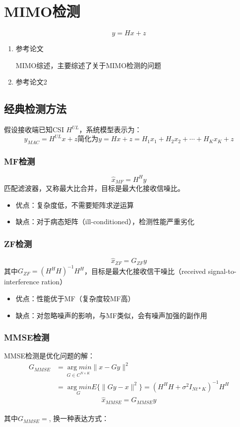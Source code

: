 \section{MIMO检测}
$$
y=Hx+z
$$

\begin{enumerate}
    \item  参考论文\cite{2019Massive} \par
        MIMO综述，主要综述了关于MIMO检测的问题
    \item 参考论文2
\end{enumerate}
\subsection{经典检测方法}
假设接收端已知CSI $H^{UL}$，系统模型表示为：
\begin{equation}
y_{MAC}=H^{UL}x+z 简化为 y=Hx+z=H_1x_1+H_2x_2+\cdots+H_Kx_K+z
\end{equation}
\subsubsection{MF检测}
\begin{equation}
\hat{x}_{MF}=H^Hy
\end{equation}
匹配滤波器，又称最大比合并，目标是最大化接收信噪比。
\begin{itemize}
    \item 优点：复杂度低，不需要矩阵求逆运算
    \item 缺点：对于病态矩阵（ill-conditioned），检测性能严重劣化
\end{itemize}
    
\subsubsection{ZF检测}
\begin{equation}
    \hat{x}_{ZF}=G_{ZF}y
\end{equation}
其中$G_{ZF}=(H^HH)^{-1}H^H$，目标是最大化接收信干噪比（received signal-to-interference ration）
\begin{itemize}
    \item 优点：性能优于MF（复杂度较MF高）
    \item 缺点：对忽略噪声的影响，与MF类似，会有噪声加强的副作用
\end{itemize}
\subsubsection{MMSE检测}
MMSE检测是优化问题的解：
\begin{equation}
\begin{aligned}
    G_{MMSE}&=\underset{G\in C^{N \times K}}{\arg min}\|x-Gy\|^2 \\
    &= \underset{G}{\arg min}E\{\|Gy-x\|^2\}=(H^HH+\sigma^2I_{Nt*K})^{-1}H^H
\end{aligned}
\end{equation}
\begin{equation}
    \hat{x}_{MMSE}=G_{MMSE}y
\end{equation} \\
其中$G_{MMSE}=$, 换一种表达方式：

